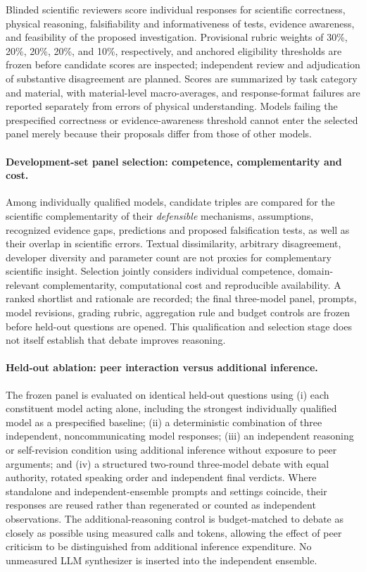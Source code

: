 \documentclass[11pt,a4paper]{article}
\begin{document}
Blinded scientific reviewers score individual responses for scientific correctness, physical reasoning, falsifiability and informativeness of tests, evidence awareness, and feasibility of the proposed investigation. Provisional rubric weights of 30\%, 20\%, 20\%, 20\%, and 10\%, respectively, and anchored eligibility thresholds are frozen before candidate scores are inspected; independent review and adjudication of substantive disagreement are planned. Scores are summarized by task category and material, with material-level macro-averages, and response-format failures are reported separately from errors of physical understanding. Models failing the prespecified correctness or evidence-awareness threshold cannot enter the selected panel merely because their proposals differ from those of other models.

\paragraph{Development-set panel selection: competence, complementarity and cost.}
Among individually qualified models, candidate triples are compared for the scientific complementarity of their \emph{defensible} mechanisms, assumptions, recognized evidence gaps, predictions and proposed falsification tests, as well as their overlap in scientific errors. Textual dissimilarity, arbitrary disagreement, developer diversity and parameter count are not proxies for complementary scientific insight. Selection jointly considers individual competence, domain-relevant complementarity, computational cost and reproducible availability. A ranked shortlist and rationale are recorded; the final three-model panel, prompts, model revisions, grading rubric, aggregation rule and budget controls are frozen before held-out questions are opened. This qualification and selection stage does not itself establish that debate improves reasoning.

\paragraph{Held-out ablation: peer interaction versus additional inference.}
The frozen panel is evaluated on identical held-out questions using (i) each constituent model acting alone, including the strongest individually qualified model as a prespecified baseline; (ii) a deterministic combination of three independent, noncommunicating model responses; (iii) an independent reasoning or self-revision condition using additional inference without exposure to peer arguments; and (iv) a structured two-round three-model debate with equal authority, rotated speaking order and independent final verdicts. Where standalone and independent-ensemble prompts and settings coincide, their responses are reused rather than regenerated or counted as independent observations. The additional-reasoning control is budget-matched to debate as closely as possible using measured calls and tokens, allowing the effect of peer criticism to be distinguished from additional inference expenditure. No unmeasured LLM synthesizer is inserted into the independent ensemble.
\end{document}
